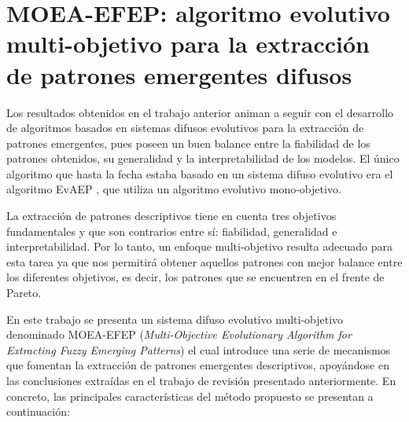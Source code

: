 \documentclass[c5paper,10pt,twoside]{book}	   	%
\begin{document}
\section{MOEA-EFEP: algoritmo evolutivo multi-objetivo para la extracción de patrones emergentes difusos} \label{sec:moea-efep}

Los resultados obtenidos en el trabajo anterior animan a seguir con el desarrollo de algoritmos basados en sistemas difusos evolutivos para la extracción de patrones emergentes, pues poseen un buen balance entre la fiabilidad de los patrones obtenidos, su generalidad y la interpretabilidad de los modelos. El único algoritmo que hasta la fecha estaba basado en un sistema difuso evolutivo era el algoritmo EvAEP \cite{Gmacd16}, que utiliza un algoritmo evolutivo mono-objetivo. 

La extracción de patrones descriptivos tiene en cuenta tres objetivos fundamentales y que son contrarios entre sí: fiabilidad, generalidad e interpretabilidad. Por lo tanto, un enfoque multi-objetivo resulta adecuado para esta tarea ya que nos permitirá obtener aquellos patrones con mejor balance entre los diferentes objetivos, es decir, los patrones que se encuentren en el frente de Pareto.

En este trabajo se presenta un sistema difuso evolutivo multi-objetivo denominado MOEA-EFEP (\textit{Multi-Objective Evolutionary Algorithm for Extracting Fuzzy Emerging Patterns}) el cual introduce una serie de mecanismos que fomentan la extracción de patrones emergentes descriptivos, apoyándose en las conclusiones extraídas en el trabajo de revisión presentado anteriormente. En concreto, las principales características del método propuesto se presentan a continuación:
\end{document}

